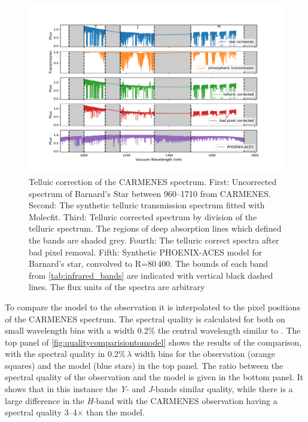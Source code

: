 \begin{figure}
    \centering
    \includegraphics[width=0.9\linewidth]{figures/information-content/Carmenes/bp_carmenes_masked_model_broadened}
    \caption[Telluic correction of the {CARMENES} \nir{} spectrum.]{Telluic correction of the {CARMENES} \nir{} spectrum.
        First: Uncorrected spectrum of Barnard's Star between 960--1710\nm{} from {CARMENES}.
        Second: The synthetic telluric transmission spectrum fitted with {Molecfit}.
        Third: Telluric corrected spectrum by division of the telluric spectrum.
        The regions of deep  absorption lines which defined the \nir{} bands are shaded grey.
        Fourth: The telluric correct spectra after bad pixel removal.
        Fifth: Synthetic PHOENIX-ACES model for Barnard's star, convolved to R=80\,400.
        The bounds of each band from \cref{tab:infrared_bands} are indicated with vertical black dashed lines.
     The flux units of the spectra are arbitrary}
    \label{fig:carmenes_correction}
\end{figure}


To compare the model to the observation it is interpolated to the pixel positions of the {CARMENES} spectrum.
The spectral quality is calculated for both on small wavelength bins with a width 0.2\% the central wavelength similar to \citep{artigau_optical_2018}.
The top panel of \cref{fig:qualitycomparisiontomodel} shows the results of the comparison, with the spectral quality in 0.2\%\,\(\lambda\) width bins for the observation (orange squares) and the model (blue stars) in the top panel.
The ratio between the spectral quality of the observation and the model is given in the bottom panel.
It shows that in this instance the \emph{Y}- and \emph{J}-bands similar quality, while there is a large difference in the \emph{H}-band with the CARMENES observation having a spectral quality 3--4\(\times\) than the model.

